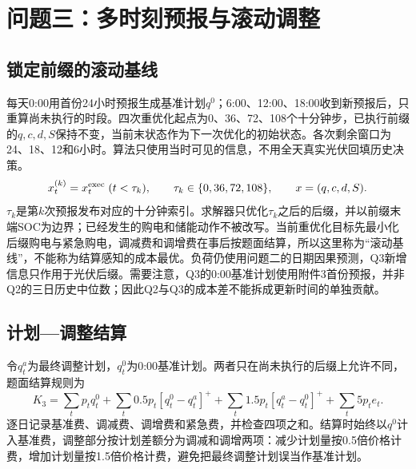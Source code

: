 \documentclass[UTF8,12pt,a4paper]{ctexart}
\begin{document}
\section{问题三：多时刻预报与滚动调整}
\subsection{锁定前缀的滚动基线}
每天0:00用首份24小时预报生成基准计划$q^0$；6:00、12:00、18:00收到新预报后，只重算尚未执行的时段。四次重优化起点为0、36、72、108个十分钟步，已执行前缀的$q,c,d,S$保持不变，当前末状态作为下一次优化的初始状态。各次剩余窗口为24、18、12和6小时。算法只使用当时可见的信息，不用全天真实光伏回填历史决策。
\begin{equation}
x_t^{(k)}=x_t^{\rm exec}\;(t<\tau_k),\qquad \tau_k\in\{0,36,72,108\},\qquad x=(q,c,d,S) .
\end{equation}
$\tau_k$是第$k$次预报发布对应的十分钟索引。求解器只优化$\tau_k$之后的后缀，并以前缀末端SOC为边界；已经发生的购电和储能动作不被改写。当前重优化目标先最小化后缀购电与紧急购电，调减费和调增费在事后按题面结算，所以这里称为“滚动基线”，不能称为结算感知的成本最优。负荷仍使用问题二的日期因果预测，Q3新增信息只作用于光伏后缀。需要注意，Q3的0:00基准计划使用附件3首份预报，并非Q2的三日历史中位数；因此Q2与Q3的成本差不能拆成更新时间的单独贡献。
\subsection{计划—调整结算}
令$q_t^a$为最终调整计划，$q_t^0$为0:00基准计划。两者只在尚未执行的后缀上允许不同，题面结算规则为
\begin{equation}\label{eq:settlement}
K_3=\sum_t p_tq_t^0+\sum_t0.5p_t[q_t^0-q_t^a]^++\sum_t1.5p_t[q_t^a-q_t^0]^++\sum_t5p_te_t .
\end{equation}
逐日记录基准费、调减费、调增费和紧急费，并检查四项之和。结算时始终以$q^0$计入基准费，调整部分按计划差额分为调减和调增两项：减少计划量按0.5倍价格计费，增加计划量按1.5倍价格计费，避免把最终调整计划误当作基准计划。
\end{document}
